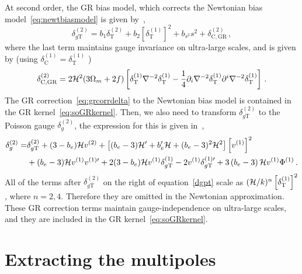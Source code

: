 At second order, the GR bias model, which corrects the Newtonian bias model~\eqref{eq:newtbiasmodel} is given by~\cite{Umeh:2019qyd},
\begin{equation}
	\delta_{g\mathrm{T}}^{(2)} = b_1 \delta_\mathrm{T}^{(2)} + b_2 \left[ \delta_\mathrm{T}^{(1)} \right]^2 + b_{s^2} s^2 + \delta_{\mathrm{C,GR}}^{(2)}\,,
\end{equation}
where the last term maintains gauge invariance on ultra-large scales, and is given by (using \( \delta_\mathrm{C}^{(1)} =  \delta_\mathrm{T}^{(1)}\) )
\begin{equation}\label{eq:grcorrdelta}
	\delta_{\mathrm{C,GR}}^{(2)} = 2 \mathcal{H}^2 (3 \Omega_m + 2 f) \left[ \delta_\mathrm{T}^{(1)} \nabla^{-2} \delta_\mathrm{T}^{(1)} - \frac{1}{4} \partial_i \nabla^{-2} \delta_\mathrm{T}^{(1)} \partial^i \nabla^{-2} \delta_\mathrm{T}^{(1)} \right]\,.
\end{equation}
The GR correction~\eqref{eq:grcorrdelta} to the Newtonian bias model is contained in the GR kernel~\eqref{eq:soGRkernel}. Then, we also need to transform \(\delta_{g\mathrm{T}}^{(2)}\) to the Poisson	 gauge \( \delta_g^{(2)} \), the expression for this is given in~\cite{Jolicoeur:2017nyt}, 
\begin{align}
\delta_{g}^{(2)}  =& \delta_{g{\mathrm{T}} }^{(2)} + (3-b_e) \mathcal{H} v^{(2)} +\left[ (b_e-3) \mathcal{H}' + b_e' \mathcal{H} + (b_e-3)^2 \mathcal{H}^2 \right]  \left[v^{(1)}\right]^2 
\nonumber \\
& + (b_e-3)\mathcal{H}   v^{(1)}  v^{(1)\prime}  +2(3-b_e)\mathcal{H}  v^{(1)} \delta_{g{\mathrm{T}}}^{(1)}  - 2  v^{(1)} \delta_{g{\mathrm{T}}}^{(1)\prime} + 3 \left( b_e-3\right) \mathcal{H} v^{(1)}\Phi^{(1)} \,.\label{dgpt}
\end{align}
All of the terms after $\delta_{g\mathrm{T}}^{(2)}$ on the right of equation~\eqref{dgpt} scale as $(\mathcal{H}/k)^n \left[ \delta^{(1)}_\mathrm{T} \right]^2$, where $n = 2,4$. Therefore they are omitted in the Newtonian approximation. These GR correction terms maintain gauge-independence on ultra-large scales, and they are included in the GR kernel~\eqref{eq:soGRkernel}.


\section{Extracting the multipoles}\label{sec:extrmulti}

